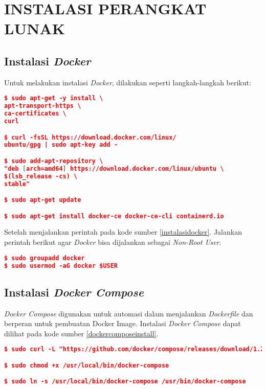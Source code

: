 \chapter{INSTALASI PERANGKAT LUNAK}

\section*{Instalasi \textit{Docker}}
	Untuk melakukan instalasi \textit{Docker}, dilakukan seperti langkah-langkah berikut:
\begin{lstlisting}[frame=single,tabsize=2,breaklines,caption={Perintah instalasi Docker },label=instalasidocker, captionpos=b, language=json,numbers=none]
$ sudo apt-get -y install \
apt-transport-https \
ca-certificates \
curl

$ curl -fsSL https://download.docker.com/linux/
ubuntu/gpg | sudo apt-key add -

$ sudo add-apt-repository \
"deb [arch=amd64] https://download.docker.com/linux/ubuntu \
$(lsb_release -cs) \
stable"

$ sudo apt-get update

$ sudo apt-get install docker-ce docker-ce-cli containerd.io
\end{lstlisting}
	
	Setelah menjalankan perintah pada kode sumber \ref{instalasidocker}. Jalankan perintah berikut agar \textit{Docker} bisa dijalankan sebagai \textit{Non-Root User}.
\begin{lstlisting}[frame=single,tabsize=2,breaklines,caption={Perintah mengubah hak User },label=nonrootuser, captionpos=b, language=json,numbers=none]
$ sudo groupadd docker
$ sudo usermod -aG docker $USER
\end{lstlisting}

\section*{Instalasi \textit{Docker Compose}}
\textit{Docker Compose} digunakan untuk automasi dalam menjalankan \textit{Dockerfile} dan berperan untuk pembuatan Docker Image. Instalasi \textit{Docker Compose} dapat dilihat pada kode sumber \ref{dockercomposeinstall}.

\begin{lstlisting}[frame=single,tabsize=2,breaklines,caption={Perintah instalasi Docker Compose},label=dockercomposeinstall, captionpos=b, language=json,numbers=none]
$ sudo curl -L "https://github.com/docker/compose/releases/download/1.24.0/docker-compose-$(uname -s)-$(uname -m)" -o /usr/local/bin/docker-compose

$ sudo chmod +x /usr/local/bin/docker-compose

$ sudo ln -s /usr/local/bin/docker-compose /usr/bin/docker-compose
\end{lstlisting}

